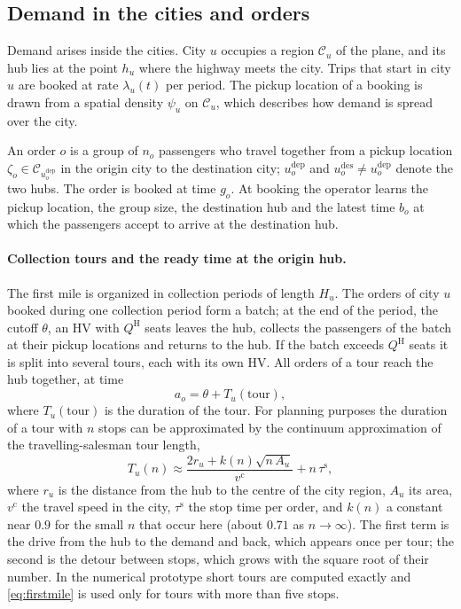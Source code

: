 \documentclass[12pt]{article}
\theoremstyle{plain}
\theoremstyle{definition}
\newcommand{\dep}{u^{\mathrm{dep}}}
\newcommand{\des}{u^{\mathrm{des}}}
\begin{document}
\subsection{Demand in the cities and orders}\label{sec:demand}

Demand arises inside the cities. City $u$ occupies a region $\mathcal{C}_u$ of the plane, and its hub lies at the point $h_u$ where the highway meets the city. Trips that start in city $u$ are booked at rate $\lambda_u(t)$ per period. The pickup location of a booking is drawn from a spatial density $\psi_u$ on $\mathcal{C}_u$, which describes how demand is spread over the city.

An order $o$ is a group of $n_o$ passengers who travel together from a pickup location $\zeta_o\in\mathcal{C}_{\dep_o}$ in the origin city to the destination city; $\dep_o$ and $\des_o\neq\dep_o$ denote the two hubs. The order is booked at time $g_o$. At booking the operator learns the pickup location, the group size, the destination hub and the latest time $b_o$ at which the passengers accept to arrive at the destination hub.

\paragraph{Collection tours and the ready time at the origin hub.} The first mile is organized in collection periods of length $H_u$. The orders of city $u$ booked during one collection period form a batch; at the end of the period, the cutoff $\theta$, an HV with $Q^{\mathrm{H}}$ seats leaves the hub, collects the passengers of the batch at their pickup locations and returns to the hub. If the batch exceeds $Q^{\mathrm{H}}$ seats it is split into several tours, each with its own HV. All orders of a tour reach the hub together, at time
\begin{equation}\label{eq:ready}
a_o=\theta+T_u(\text{tour}),
\end{equation}
where $T_u(\text{tour})$ is the duration of the tour. For planning purposes the duration of a tour with $n$ stops can be approximated by the continuum approximation of the travelling-salesman tour length,
\begin{equation}\label{eq:firstmile}
T_u(n)\approx\frac{2r_u+k(n)\sqrt{n\,A_u}}{v^{\mathrm{c}}}+n\,\tau^{\mathrm{s}},
\end{equation}
where $r_u$ is the distance from the hub to the centre of the city region, $A_u$ its area, $v^{\mathrm{c}}$ the travel speed in the city, $\tau^{\mathrm{s}}$ the stop time per order, and $k(n)$ a constant near $0.9$ for the small $n$ that occur here (about $0.71$ as $n\to\infty$). The first term is the drive from the hub to the demand and back, which appears once per tour; the second is the detour between stops, which grows with the square root of their number. In the numerical prototype short tours are computed exactly and \eqref{eq:firstmile} is used only for tours with more than five stops.
\end{document}
